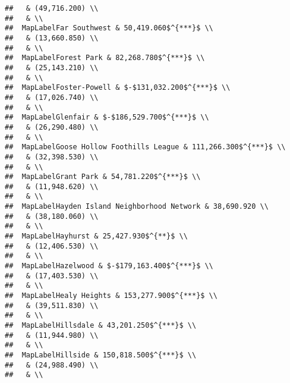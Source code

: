 \documentclass[]{article}
\begin{document}
\begin{verbatim}
##   & (49,716.200) \\ 
##   & \\ 
##  MapLabelFar Southwest & 50,419.060$^{***}$ \\ 
##   & (13,660.850) \\ 
##   & \\ 
##  MapLabelForest Park & 82,268.780$^{***}$ \\ 
##   & (25,143.210) \\ 
##   & \\ 
##  MapLabelFoster-Powell & $-$131,032.200$^{***}$ \\ 
##   & (17,026.740) \\ 
##   & \\ 
##  MapLabelGlenfair & $-$186,529.700$^{***}$ \\ 
##   & (26,290.480) \\ 
##   & \\ 
##  MapLabelGoose Hollow Foothills League & 111,266.300$^{***}$ \\ 
##   & (32,398.530) \\ 
##   & \\ 
##  MapLabelGrant Park & 54,781.220$^{***}$ \\ 
##   & (11,948.620) \\ 
##   & \\ 
##  MapLabelHayden Island Neighborhood Network & 38,690.920 \\ 
##   & (38,180.060) \\ 
##   & \\ 
##  MapLabelHayhurst & 25,427.930$^{**}$ \\ 
##   & (12,406.530) \\ 
##   & \\ 
##  MapLabelHazelwood & $-$179,163.400$^{***}$ \\ 
##   & (17,403.530) \\ 
##   & \\ 
##  MapLabelHealy Heights & 153,277.900$^{***}$ \\ 
##   & (39,511.830) \\ 
##   & \\ 
##  MapLabelHillsdale & 43,201.250$^{***}$ \\ 
##   & (11,944.980) \\ 
##   & \\ 
##  MapLabelHillside & 150,818.500$^{***}$ \\ 
##   & (24,988.490) \\ 
##   & \\ 

\end{verbatim}
\end{document}
